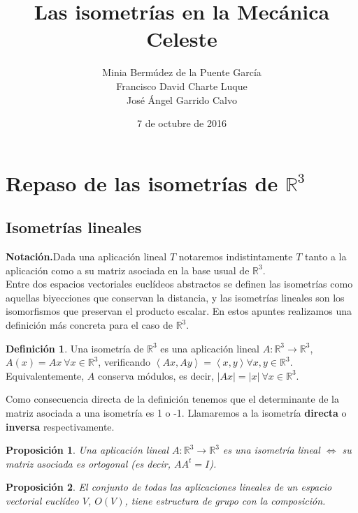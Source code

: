 \documentclass[11pt]{article}
\title{Las isometrías en la Mecánica Celeste}
\author{Minia Bermúdez de la Puente García \\ Francisco David Charte Luque \\ José Ángel Garrido Calvo}
\date{7 de octubre de 2016}
\newtheorem{prop}{Proposición}[section]
\theoremstyle{definition}
\newtheorem{mydef}{Definición}[section]
\begin{document}
\maketitle

\vphantom{A}

\tableofcontents
\newpage

\section{Repaso de las isometrías de $\mathbb{R}^3$}
	\subsection{Isometrías lineales}

    \noindent\textbf{Notación.}\quad Dada una aplicación lineal $T$ notaremos indistintamente $T$ tanto a la aplicación como a su matriz asociada en la base usual de $\mathbb R^3$.
    \\

    Entre dos espacios vectoriales euclídeos abstractos se definen las isometrías como aquellas biyecciones que conservan la distancia, y las isometrías lineales son los isomorfismos que preservan el producto escalar. En estos apuntes realizamos una definición más concreta para el caso de $\mathbb R^3$.

    \begin{mydef}
    Una isometría de $\mathbb R^3$ es una aplicación lineal $A:\mathbb R^3\rightarrow \mathbb R^3$, $A(x)=Ax\ \forall x\in \mathbb{R}^3$, verificando $\left<Ax,Ay\right>=\left<x,y\right>\forall x,y\in \mathbb R^3$. Equivalentemente, $A$ conserva módulos, es decir, $|Ax|=|x|\ \forall x\in\mathbb R^3$.
    \end{mydef}

    Como consecuencia directa de la definición tenemos que el determinante de la matriz asociada a una isometría es 1 o -1. Llamaremos a la isometría \textbf{directa} o \textbf{inversa} respectivamente.

	\begin{prop}
    Una aplicación lineal $A:\mathbb R^3\rightarrow\mathbb{R}^3$ es una isometría lineal $\Leftrightarrow$ su matriz asociada es ortogonal (es decir, $AA^t=I$).
    \end{prop}
	\begin{prop}
    El conjunto de todas las aplicaciones lineales de un espacio vectorial euclídeo $V$, $O(V)$, tiene estructura de grupo con la composición.
    \end{prop}
\end{document}
